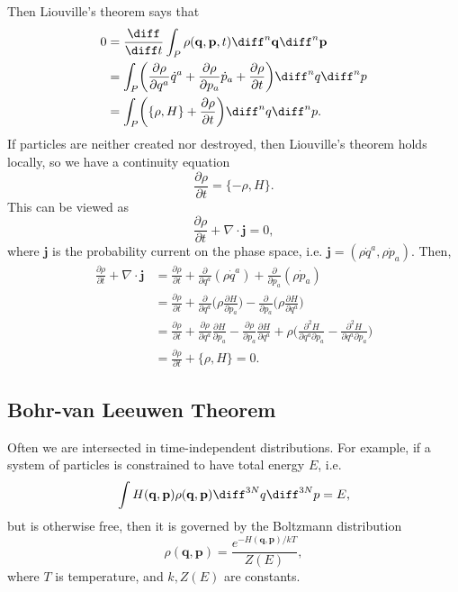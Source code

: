 \documentclass[12pt]{article}
\begin{document}
Then Liouville's theorem says that
\begin{align*}
	0 &= \frac{\diff}{\diff t} \int_P \rho(\mathbf{q}, \mathbf{p}, t) \diff^n \mathbf{q} \diff^n \mathbf{p} \\
	  &= \int_P \biggl( \frac{\partial \rho}{\partial q^a} \dot q^a + \frac{\partial \rho}{\partial p_a} \dot p_a + \frac{\partial \rho}{\partial t} \biggr) \diff^n q \diff^n p \\
	  &= \int_P \biggl( \{\rho, H\} + \frac{\partial \rho}{\partial t} \biggr) \diff^n q \diff^n p.
\end{align*}
If particles are neither created nor destroyed, then Liouville's theorem holds locally, so we have a continuity equation
\[
	\frac{\partial \rho}{\partial t} = \{- \rho, H\}.
\]
This can be viewed as
\[
\frac{\partial \rho}{\partial t} + \nabla \cdot \mathbf{j} = 0,
\]
where $\mathbf{j}$ is the probability current on the phase space, i.e. $\mathbf{j} = (\rho \dot q^a, \rho \dot p_a)$. Then,
\begin{align*}
	\frac{\partial \rho}{\partial t} + \nabla \cdot \mathbf{j} &= \frac{\partial \rho}{\partial t} + \frac{\partial}{\partial q^a}(\rho \dot q^a) + \frac{\partial}{\partial p_a}(\rho \dot p_a) \\
								   &= \frac{\partial \rho}{\partial t} + \frac{\partial}{\partial q^a} \biggl( \rho \frac{\partial H}{\partial p_a} \biggr) - \frac{\partial}{\partial p_a} \biggl( \rho \frac{\partial H}{\partial q^a} \biggr) \\
								   &= \frac{\partial \rho}{\partial t} + \frac{\partial \rho}{\partial q^a} \frac{\partial H}{\partial p_a} - \frac{\partial \rho}{\partial p_a} \frac{\partial H}{\partial q^a} + \rho \biggl( \frac{\partial^2 H}{\partial q^a \partial p_a} - \frac{\partial^2 H}{\partial q^a \partial p_a} \biggr) \\
								   &= \frac{\partial \rho}{\partial t} + \{\rho, H\} = 0.
\end{align*}

\subsection{Bohr-van Leeuwen Theorem}
\label{sub:bvl_thm}

Often we are intersected in time-independent distributions. For example, if a system of particles is constrained to have total energy $E$, i.e.
\[
\int H(\mathbf{q}, \mathbf{p}) \rho (\mathbf{q}, \mathbf{p}) \diff^{3N} q \diff^{3N} p = E,
\]
but is otherwise free, then it is governed by the Boltzmann distribution
\[
\rho(\mathbf{q}, \mathbf{p}) = \frac{e^{-H(\mathbf{q}, \mathbf{p})/kT}}{Z(E)},
\]
where $T$ is temperature, and $k, Z(E)$ are constants.
\end{document}
